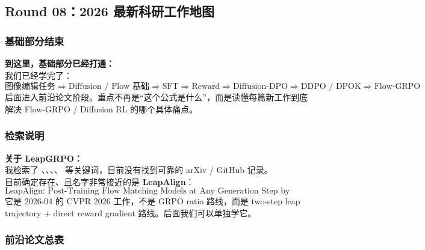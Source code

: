 
\subsection{Round 08：2026 最新科研工作地图}

\subsubsection{基础部分结束}

\begin{summarybox}
\textbf{到这里，基础部分已经打通：}\\
我们已经学完了：
\[
\text{图像编辑任务}
\Rightarrow
\text{Diffusion / Flow 基础}
\Rightarrow
\text{SFT}
\Rightarrow
\text{Reward}
\Rightarrow
\text{Diffusion-DPO}
\Rightarrow
\text{DDPO / DPOK}
\Rightarrow
\text{Flow-GRPO}
\]
后面进入前沿论文阶段。重点不再是“这个公式是什么”，而是读懂每篇新工作到底解决 Flow-GRPO / Diffusion RL 的哪个具体痛点。
\end{summarybox}

\subsubsection{检索说明}

\begin{warnbox}
\textbf{关于 LeapGRPO：}\\
我检索了 、、、、 等关键词，目前没有找到可靠的 arXiv / GitHub 记录。\\
目前确定存在、且名字非常接近的是 \textbf{LeapAlign}：
\[
\text{LeapAlign: Post-Training Flow Matching Models at Any Generation Step by Building Two-Step Trajectories}
\]
它是 2026-04 的 CVPR 2026 工作，不是 GRPO ratio 路线，而是 two-step leap trajectory + direct reward gradient 路线。后面我们可以单独学它。
\end{warnbox}

\subsubsection{前沿论文总表}


